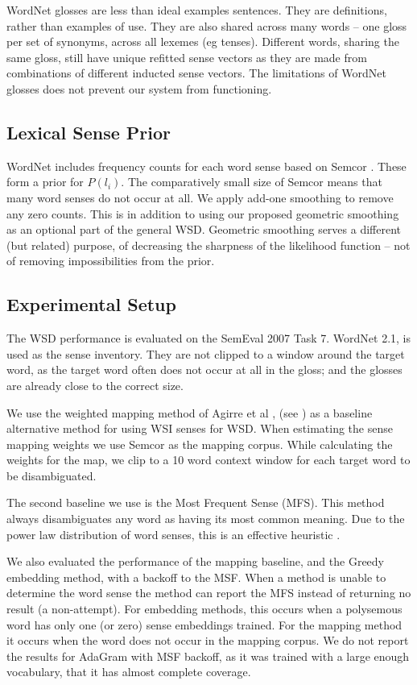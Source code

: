 \documentclass{article}
\def\parencite{\cite}
\begin{document}
WordNet glosses are less than ideal examples sentences. They are definitions, rather than examples of use. They are also shared across many words -- one gloss per set of synonyms, across all lexemes (eg tenses).
Different words, sharing the same gloss, still have unique refitted sense vectors as they are made from combinations of different inducted sense vectors.
The limitations of WordNet glosses does not prevent our system from functioning.

\subsection{Lexical Sense Prior}
WordNet includes frequency counts for each word sense based on Semcor \parencite{tengi1998design}. These form a prior for $P(l_i)$.
The comparatively small size of Semcor means that many word senses do not occur at all.
We apply add-one smoothing to remove any zero counts.
This is in addition to using our proposed geometric smoothing as an optional part of the general WSD.
Geometric smoothing serves a different (but related) purpose, of decreasing the sharpness of the likelihood function -- not of removing impossibilities from the prior.

\subsection {Experimental Setup}
The WSD performance is evaluated on the SemEval 2007 Task 7. 
WordNet 2.1, is used as the sense inventory.
They are not clipped to a window around the target word, as the target word often does not occur at all in the gloss; and the glosses are already close to the correct size.

We use the weighted mapping method of Agirre et al , (see ) as a baseline alternative method for using WSI senses for WSD.
When estimating the sense mapping weights we use Semcor as the mapping corpus.
While calculating the weights for the map, we clip to a 10 word context window for each target word to be disambiguated.

The second baseline we use is the Most Frequent Sense (MFS). This method always disambiguates any word as having its  most common meaning. Due to the power law distribution of word senses, this is an effective heuristic \parencite{Kilgarriff2004}.

We also evaluated the performance of the mapping baseline, and the Greedy embedding method, with a backoff to the MSF. When a method is unable to determine the word sense the method can report the MFS instead of returning no result (a non-attempt). For embedding methods, this occurs when a polysemous word has only one (or zero) sense embeddings trained. For the mapping method it occurs when the word does not occur in the mapping corpus. We do not report the results for AdaGram with MSF backoff, as it was trained with a large enough vocabulary, that it has almost complete coverage.
\end{document}
